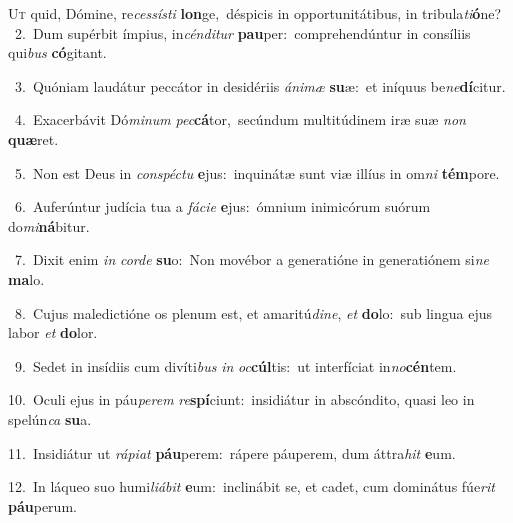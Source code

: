 \lettrine{\initial\textcolor{\initialcolor}{U}}{t} quid, Dómine, re\-\textit{ces}\-\textit{sís}\textit{ti} \textbf{lon}\-ge,~\star déspicis in opportunitátibus, in tribula\-\textit{ti}\-\textbf{ó}ne?\\
{\numbfont\textcolor{\numbcolor}{~2.}}~Dum supérbit ímpius, in\-\textit{cén}\-\textit{di}\textit{tur} \textbf{pau}\-per:~\star comprehendúntur in consíliis qui\textit{bus} \textbf{có}\-gitant.\par
{\numbfont\textcolor{\numbcolor}{~3.}}~Quóniam laudátur peccátor in desidériis \textit{á}\-\textit{ni}\textit{mæ} \textbf{su}\-æ:~\star et iníquus be\-\textit{ne}\-\textbf{dí}citur.\par
{\numbfont\textcolor{\numbcolor}{~4.}}~Exacerbávit Dó\-\textit{mi}\-\textit{num} \textit{pec}\-\textbf{cá}tor,~\star secúndum multitúdinem iræ suæ \textit{non} \textbf{quæ}\-ret.\par
{\numbfont\textcolor{\numbcolor}{~5.}}~Non est Deus in \textit{con}\-\textit{spéc}\textit{tu} \textbf{e}\-jus:~\star inquinátæ sunt viæ illíus in om\textit{ni} \textbf{tém}\-pore.\par
{\numbfont\textcolor{\numbcolor}{~6.}}~Auferúntur judícia tua a \textit{fá}\-\textit{ci}\textit{e} \textbf{e}\-jus:~\star ómnium inimicórum suórum do\-\textit{mi}\-\textbf{ná}bitur.\par
{\numbfont\textcolor{\numbcolor}{~7.}}~Dixit enim \textit{in} \textit{cor}\-\textit{de} \textbf{su}\-o:~\star Non movébor a generatióne in generatiónem si\textit{ne} \textbf{ma}\-lo.\par
{\numbfont\textcolor{\numbcolor}{~8.}}~Cujus maledictióne os plenum est, et amaritú\-\textit{di}\-\textit{ne}, \textit{et} \textbf{do}\-lo:~\star sub lingua ejus labor \textit{et} \textbf{do}\-lor.\par
{\numbfont\textcolor{\numbcolor}{~9.}}~Sedet in insídiis cum divíti\textit{bus} \textit{in} \textit{oc}\-\textbf{cúl}tis:~\star ut interfíciat in\-\textit{no}\-\textbf{cén}tem.\par
{\numbfont\textcolor{\numbcolor}{10.}}~Oculi ejus in páu\-\textit{pe}\-\textit{rem} \textit{re}\-\textbf{spí}ciunt:~\star insidiátur in abscóndito, quasi leo in spelún\textit{ca} \textbf{su}\-a.\par
{\numbfont\textcolor{\numbcolor}{11.}}~Insidiátur ut \textit{rá}\-\textit{pi}\textit{at} \textbf{páu}\-perem:~\star rápere páuperem, dum áttra\textit{hit} \textbf{e}\-um.\par
{\numbfont\textcolor{\numbcolor}{12.}}~In láqueo suo humi\-\textit{li}\-\textit{á}\textit{bit} \textbf{e}\-um:~\star inclinábit se, et cadet, cum dominátus fúe\textit{rit} \textbf{páu}\-perum.\par
